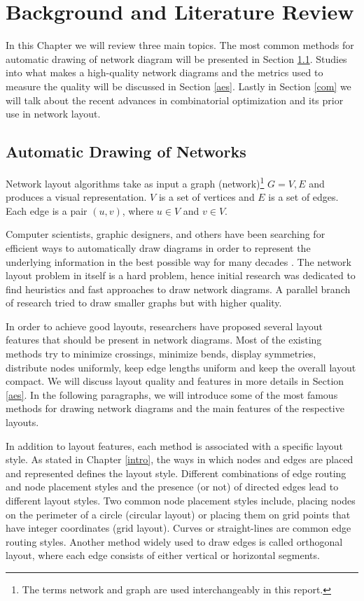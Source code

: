 \documentclass[a4paper,11pt,phdthesis,singlespace,twoside]{cssethesis}
\begin{document}
\chapter{Background and Literature Review} \label{litrev}

In this Chapter we will review three main topics. The most common methods for automatic drawing of network diagram will be presented in Section \ref{tec}. Studies into what makes a high-quality network diagrams and the metrics used to measure the quality will be discussed in Section \ref{aes}. Lastly in Section \ref{com} we will talk about the recent advances in combinatorial optimization and its prior use in network layout.

\section{Automatic Drawing of Networks} \label{tec}

	Network layout algorithms take as input a graph (network)\footnote{The terms network and graph are used interchangeably in this report.} $G = {V,E}$ and produces a visual representation. $V$ is a set of vertices and $E$ is a set of edges. Each edge is a pair $(u,v)$, where $u \in V$ and $v \in V$. 
	
	Computer scientists, graphic designers, and others have been searching for efficient ways to automatically draw diagrams in order to represent the underlying information in the best possible way for many decades \cite{tamassia2013handbook}. The network layout problem in itself is a hard problem, hence initial research was dedicated to find heuristics and fast approaches to draw network diagrams. A parallel branch of research tried to draw smaller graphs but with higher quality.

In order to achieve good layouts, researchers have proposed several layout features that should be present in network diagrams. Most of the existing methods try to minimize crossings, minimize bends, display symmetries, distribute nodes uniformly, keep edge lengths uniform and keep the overall layout compact. We will discuss layout quality and features in more details in Section \ref{aes}. In the following paragraphs, we will introduce some of the most famous methods for drawing network diagrams and the main features of the respective layouts.

In addition to layout features, each method is associated with a specific layout style. As stated in Chapter \ref{intro}, the ways in which nodes and edges are placed and represented defines the layout style. Different combinations of edge routing and node placement styles and the presence (or not) of directed edges lead to different layout styles. Two common node placement styles include, placing nodes on the perimeter of a circle (circular layout) or placing them on grid points that have integer coordinates (grid layout). Curves or straight-lines are common edge routing styles. Another method widely used to draw edges is called orthogonal layout, where each edge consists of either vertical or horizontal segments.
\end{document}
